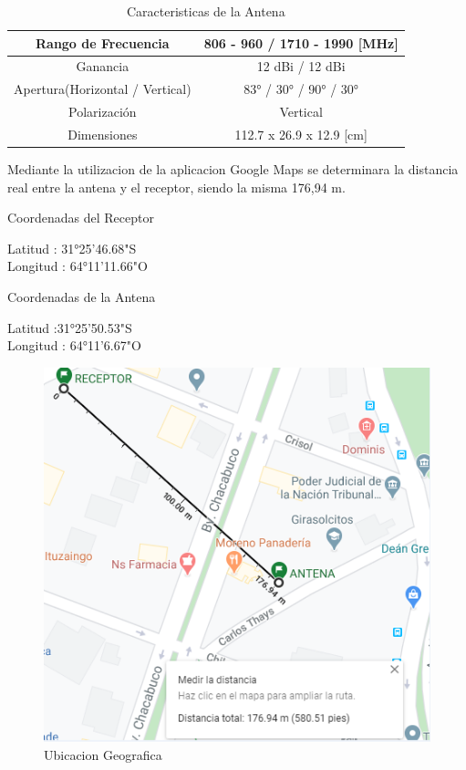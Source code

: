 \documentclass[conference, 9pt, a4paper]{IEEEtran}
\begin{document}
\begin{table}
\centering
\begin{tabular}{|c|c|}\hline  
	Rango de Frecuencia					    & 806 - 960 / 1710 - 1990 [MHz] \\ \hline 
	Ganancia								& 12 dBi / 12 dBi \\ \hline 
	Apertura(Horizontal / Vertical)			& 83° / 30° / 90° / 30° \\ \hline
	Polarización 							& Vertical \\ \hline
	Dimensiones								& 112.7 x 26.9 x 12.9  [cm] \\ \hline
\end{tabular}
\caption{Caracteristicas de la Antena}
\end{table}





Mediante la utilizacion de la aplicacion Google Maps se determinara la distancia real entre la antena y el receptor, siendo la misma 176,94 m.
\begin{center}
 Coordenadas del Receptor 
 \end{center} 
Latitud : 31°25'46.68"S\\
Longitud : 64°11'11.66"O \\
\begin{center}
 Coordenadas de la Antena
 \end{center} 
Latitud :31°25'50.53"S\\
Longitud :  64°11'6.67"O \\





\begin{figure}
	\centering
	\includegraphics[width=\columnwidth]{image/Captura.PNG}
	\caption{Ubicacion Geografica}
\end{figure}
\end{document}
